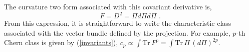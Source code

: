 \documentclass[a4paper,12pt]{article}
\begin{document}

The curvature two form associated with this covariant derivative
is,
\begin{equation}
 F=D^2 = \Pi d\Pi d \Pi\,\,.
\end{equation}
{}From this expression, it is straightforward to write
the characteristic class associated with the vector 
bundle defined by the projection.
For example, $p$-th Chern class is given by (\ref{invariants}),
$ c_p\propto \int \mbox{Tr}\, F^p  = \int \mbox{Tr}\, \Pi\,(d\Pi)^{2p}$.
\end{document}
